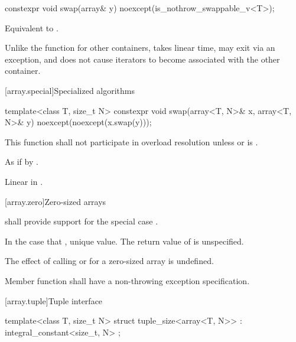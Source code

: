 %
\begin{itemdecl}
constexpr void swap(array& y) noexcept(is_nothrow_swappable_v<T>);
\end{itemdecl}

\begin{itemdescr}
\pnum
\effects Equivalent to .

\pnum
\begin{note}
Unlike the  function for other containers, 
takes linear time, may exit via an exception, and does not cause iterators to
become associated with the other container.
\end{note}
\end{itemdescr}

[array.special]{Specialized algorithms}

%
\begin{itemdecl}
template<class T, size_t N>
  constexpr void swap(array<T, N>& x, array<T, N>& y) noexcept(noexcept(x.swap(y)));
\end{itemdecl}

\begin{itemdescr}
\pnum\remarks
This function shall not participate in overload resolution
unless  or  is .

\pnum\effects
As if by .

\pnum
\complexity Linear in .
\end{itemdescr}

[array.zero]{Zero-sized arrays}

%
\pnum{} shall provide support for the special case .

\pnum In the case that ,  unique value.
The return value of  is unspecified.

\pnum
The effect of calling  or  for a zero-sized array is
undefined.

\pnum
Member function  shall have a
non-throwing exception specification.

[array.tuple]{Tuple interface}
%
%
%
%
\begin{itemdecl}
template<class T, size_t N>
  struct tuple_size<array<T, N>> : integral_constant<size_t, N> { };
\end{itemdecl}

